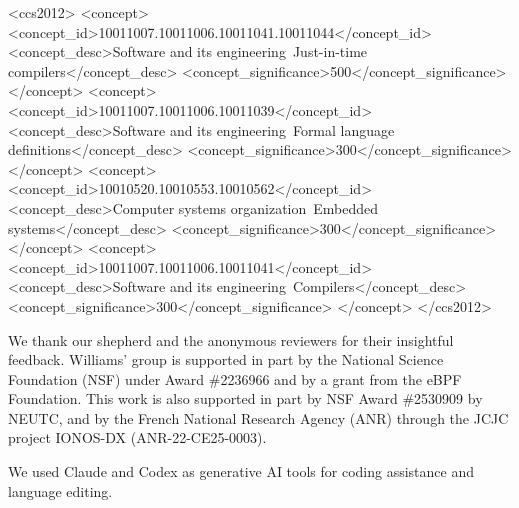 \documentclass[sigplan,10pt]{acmart}
\begin{document}
\begin{CCSXML}
<ccs2012>
 <concept>
  <concept_id>10011007.10011006.10011041.10011044</concept_id>
  <concept_desc>Software and its engineering~Just-in-time compilers</concept_desc>
  <concept_significance>500</concept_significance>
 </concept>
 <concept>
  <concept_id>10011007.10011006.10011039</concept_id>
  <concept_desc>Software and its engineering~Formal language definitions</concept_desc>
  <concept_significance>300</concept_significance>
 </concept>
 <concept>
  <concept_id>10010520.10010553.10010562</concept_id>
  <concept_desc>Computer systems organization~Embedded systems</concept_desc>
  <concept_significance>300</concept_significance>
 </concept>
 <concept>
  <concept_id>10011007.10011006.10011041</concept_id>
  <concept_desc>Software and its engineering~Compilers</concept_desc>
  <concept_significance>300</concept_significance>
 </concept>
</ccs2012>
\end{CCSXML}




\maketitle
\fancyhf{}
\renewcommand{\headrulewidth}{0pt}










\begin{acks}
We thank our shepherd and the anonymous reviewers for their insightful feedback.
Williams' group is supported in part by the National Science Foundation (NSF) under Award \#2236966 and by a grant from the eBPF Foundation.
This work is also supported in part by NSF Award \#2530909 by NEUTC, and by the French National Research Agency (ANR) through the JCJC project IONOS-DX (ANR-22-CE25-0003).

We used Claude and Codex as generative AI tools for coding assistance and language editing.
\end{acks}



\end{document}
